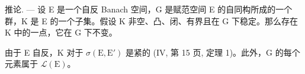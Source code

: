 推论. --- 设 E 是一个自反 Banach 空间，G 是赋范空间 E 的自同构所成的一个群，K 是 E 的一个子集。假设 K 非空、凸、闭、有界且在 G 下稳定。那么存在 K 中的一点，它在 G 下不变。

由于 E 自反，K 对于 \(\sigma(\mathrm{E}, \mathrm{E}')\) 是紧的 (IV, 第 15 页, 定理 1)。此外，G 的每个元素属于 \(\mathcal{L}(\mathrm{E})\)。

